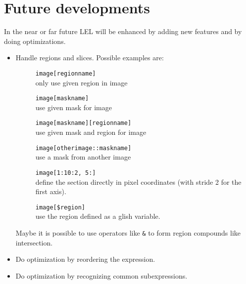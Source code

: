 \section{Future developments}
In the near or far future LEL will be enhanced by adding new
features and by doing optimizations.
\begin{itemize}
  \item Handle regions and slices. Possible examples are:
    \begin{description}
      \item[] \texttt{image[regionname]}
        \\only use given region in image
      \item[] \texttt{image[maskname]}
        \\use given mask for image
      \item[] \texttt{image[maskname][regionname]}
        \\use given mask and region for image
      \item[] \texttt{image[otherimage::maskname]}
        \\use a mask from another image 
      \item[] \texttt{image[1:10:2, 5:]}
        \\define the section directly in pixel coordinates (with
        stride 2 for the first axis).
      \item[] \texttt{image[\$region]}
        \\use the region defined as a glish variable.
    \end{description}
    Maybe it is possible to use operators like \texttt{\&} to
    form region compounds like intersection.
  \item Do optimization by reordering the expression.
  \item Do optimization by recognizing common subexpressions.
\end{itemize}
